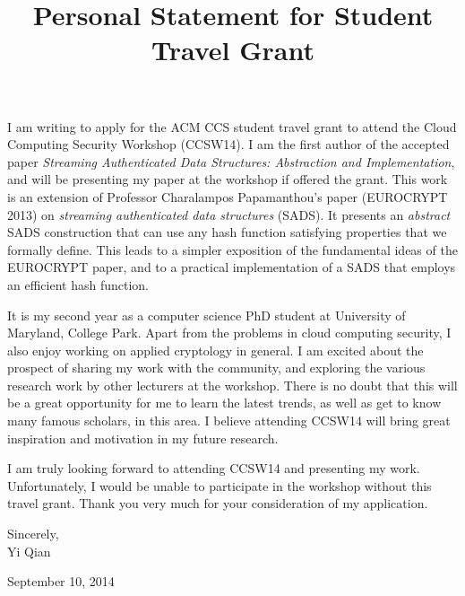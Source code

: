 \documentclass[12pt]{article}
\begin{document}
\title{Personal Statement for Student Travel Grant}
\date{}
\maketitle



I am writing to apply for the ACM CCS student travel grant to attend the Cloud Computing Security Workshop (CCSW14). I am the first author of the accepted paper {\it Streaming Authenticated Data Structures: Abstraction and Implementation}, and will be presenting my paper at the workshop if offered the grant. This work is an extension of Professor Charalampos Papamanthou's paper (EUROCRYPT 2013) on {\it streaming authenticated data structures} (SADS). It presents an {\it abstract} SADS construction that can use any hash function satisfying properties that we formally define. This leads to a simpler exposition of the fundamental ideas of the EUROCRYPT paper, and to a practical implementation of a SADS that employs an efficient hash function.

It is my second year as a computer science PhD student at University of Maryland, College Park. Apart from the problems in cloud computing security, I also enjoy working on applied cryptology in general. I am excited about the prospect of sharing my work with the community, and exploring the various research work by other lecturers at the workshop. There is no doubt that this will be a great opportunity for me to learn the latest trends, as well as get to know many famous scholars, in this area. I believe attending CCSW14 will bring great inspiration and motivation in my future research.

I am truly looking forward to attending CCSW14 and presenting my work. Unfortunately, I would be unable to participate in the workshop without this travel grant. Thank you very much for your consideration of my application.

\bigskip
Sincerely,\\


\bigskip
Yi Qian

September 10, 2014
\end{document}
